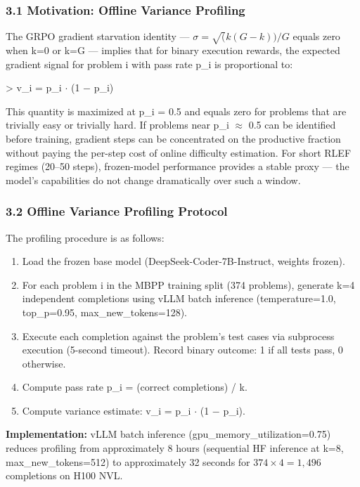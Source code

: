 
\subsubsection{3.1 Motivation: Offline Variance Profiling}

The GRPO gradient starvation identity --- $\sigma = \sqrt(k(G-k))/G$ equals zero when k=0 or k=G --- implies that for binary execution rewards, the expected gradient signal for problem i with pass rate p\_i is proportional to:

> v\_i = p\_i $\cdot$ (1 $-$ p\_i)

This quantity is maximized at p\_i = 0.5 and equals zero for problems that are trivially easy or trivially hard. If problems near p\_i $\approx$ 0.5 can be identified before training, gradient steps can be concentrated on the productive fraction without paying the per-step cost of online difficulty estimation. For short RLEF regimes (20--50 steps), frozen-model performance provides a stable proxy --- the model's capabilities do not change dramatically over such a window.

\subsubsection{3.2 Offline Variance Profiling Protocol}

The profiling procedure is as follows:

\begin{enumerate}
\item Load the frozen base model (DeepSeek-Coder-7B-Instruct, weights frozen).
\item For each problem i in the MBPP training split (374 problems), generate k=4 independent completions using vLLM batch inference (temperature=1.0, top\_p=0.95, max\_new\_tokens=128).
\item Execute each completion against the problem's test cases via subprocess execution (5-second timeout). Record binary outcome: 1 if all tests pass, 0 otherwise.
\item Compute pass rate p\_i = (correct completions) / k.
\item Compute variance estimate: v\_i = p\_i $\cdot$ (1 $-$ p\_i).
\end{enumerate}

\textbf{Implementation:} vLLM batch inference (gpu\_memory\_utilization=0.75) reduces profiling from approximately 8 hours (sequential HF inference at k=8, max\_new\_tokens=512) to approximately 32 seconds for $374\times 4=1,496$ completions on H100 NVL.

